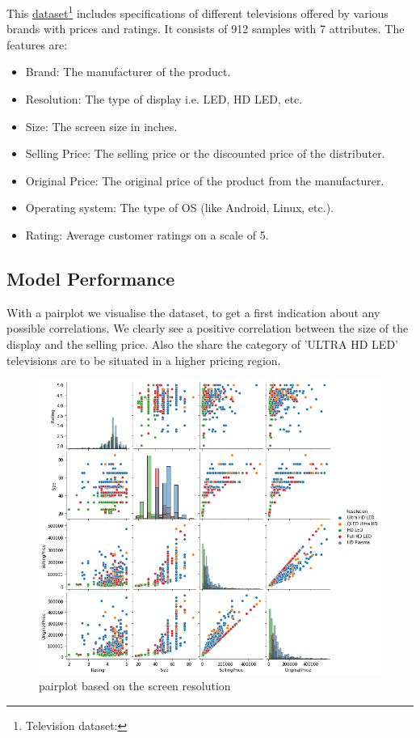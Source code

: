 This \href{\kagglelinktv}{dataset\footnote{Television dataset:\href{\kagglelinktv}{\kagglelinktv}}} includes specifications of different televisions offered by various brands with prices and ratings. It consists of 912 samples with 7 attributes. The features are:

\begin{itemize}
    \item Brand: The manufacturer of the product.
    \item Resolution: The type of display i.e. LED, HD LED, etc.
    \item Size: The screen size in inches.
    \item Selling Price: The selling price or the discounted price of the distributer.
    \item Original Price: The original price of the product from the manufacturer.
    \item Operating system: The type of OS (like Android, Linux, etc.).
    \item Rating: Average customer ratings on a scale of 5.
\end{itemize}

\subsection{Model Performance}
With a pairplot we visualise the dataset, to get a first indication about any possible correlations. We clearly see a positive correlation between the size of the display and the selling price. Also the share the category of 'ULTRA HD LED' televisions are to be situated in a higher pricing region.
\begin{figure}
    \begin{center}
        \includegraphics[width=0.7\linewidth]{images/pairplot_resolution.png}
        \caption{pairplot based on the screen resolution}
        \label{fig:PairplotResolution}
    \end{center}
\end{figure}


